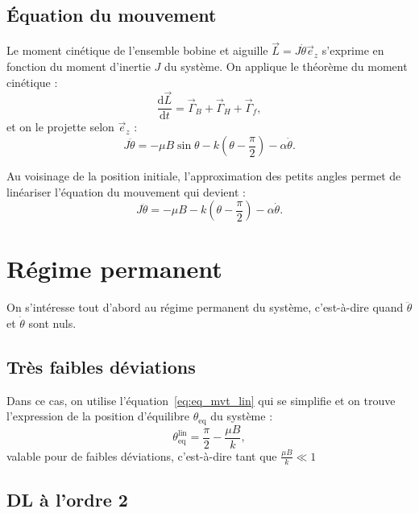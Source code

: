\documentclass[12pt,a4paper,fleqn]{article}
\newcommand{\ez}{\vec{e}_z}
\renewcommand{\d}{\mathrm{d}}
\newcommand{\cad}{c'est-à-dire}
\begin{document}
\subsection{Équation du mouvement}

Le moment cinétique de l'ensemble bobine et aiguille $\vec{L} = J\dot{\theta}\ez$ s'exprime en fonction du moment d'inertie $J$ du système.
On applique le théorème du moment cinétique :
\begin{equation}
\frac{\d\vec{L}}{\d t} 	= \vec{\Gamma}_B + \vec{\Gamma}_H + \vec{\Gamma}_f,
\end{equation}
et on le projette selon $\ez$ :
\begin{equation}
J\ddot{\theta} = -\mu B \sin \theta - k\left(\theta-\frac{\pi}{2}\right) - \alpha\dot{\theta}.
\label{eq:eq_mvt}
\end{equation}

Au voisinage de la position initiale, l'approximation des petits angles permet de linéariser l'équation du mouvement qui devient :
\begin{equation}
J\ddot{\theta} = -\mu B - k\left(\theta-\frac{\pi}{2}\right) - \alpha\dot{\theta}.
\label{eq:eq_mvt_lin}
\end{equation}

\section{Régime permanent}

On s'intéresse tout d'abord au régime permanent du système, \cad{} quand $\ddot{\theta}$ et $\dot{\theta}$ sont nuls.

\subsection{Très faibles déviations}

Dans ce cas, on utilise l'équation~\ref{eq:eq_mvt_lin} qui se simplifie et on trouve  l'expression de la position d'équilibre $\theta_\mathrm{eq}$ du système :
\begin{equation}
\theta_\mathrm{eq}^\mathrm{lin} = \frac{\pi}{2} - \frac{\mu B}{k},
\end{equation}
valable pour de faibles déviations, \cad{} tant que $\frac{\mu B}{k} \ll 1$

\subsection{DL à l'ordre 2}
\end{document}
